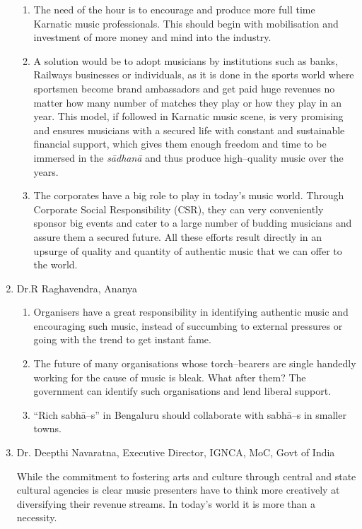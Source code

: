 \begin{enumerate}
\begin{enumerate}
 \item The need of the hour is to encourage and produce more full time Karnatic music professionals. This should begin with mobilisation and investment of more money and mind into the industry.

 \item A solution would be to adopt musicians by institutions such as banks, Railways businesses or individuals, as it is done in the sports world where sportsmen become brand ambassadors and get paid huge revenues no matter how many number of matches they play or how they play in an year. This model, if followed in Karnatic music scene, is very promising and ensures musicians with a secured life with constant and sustainable financial support, which gives them enough freedom and time to be immersed in the \textit{sādhanā} and thus produce high–quality music over the years.

 \item The corporates have a big role to play in today’s music world. Through Corporate Social Responsibility (CSR), they can very conveniently sponsor big events and cater to a large number of budding musicians and assure them a secured future. All these efforts result directly in an upsurge of quality and quantity of authentic music that we can offer to the world.
\end{enumerate}

 \newpage

 \item Dr.R Raghavendra, Ananya
 
\begin{enumerate}
\itemsep=0pt
\item Organisers have a great responsibility in identifying authentic music and encouraging such music, instead of succumbing to external pressures or going with the trend to get instant fame.

 \item The future of many organisations whose torch–bearers are single handedly working for the cause of music is bleak. What after them? The government can identify such organisations and lend liberal support.

 \item “Rich sabhā–s” in Bengaluru should collaborate with sabhā–s in smaller towns.
\end{enumerate}

 \item 
 Dr. Deepthi Navaratna, Executive Director, IGNCA, MoC, Govt of India

 While the commitment to fostering arts and culture through central and state cultural agencies is clear music presenters have to think more creatively at diversifying their revenue streams. In today’s world it is more than a necessity.

\end{enumerate}


